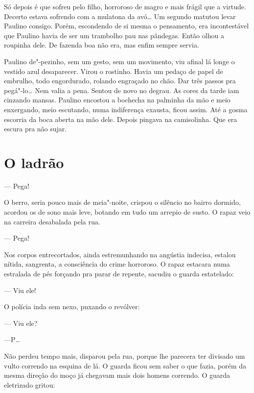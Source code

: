 Só depois é que sofreu pelo filho, horroroso de magro e mais frágil que
a virtude. Decerto estava sofrendo com a mulatona da avó\ldots{} Um segundo
matutou levar Paulino consigo. Porém, escondendo de si mesma o
pensamento, era incontestável que Paulino havia de ser um trambolho pau
nas pândegas. Então olhou a roupinha dele. De fazenda boa não era, mas
enfim sempre servia. 


Paulino de"-pezinho, sem um gesto, sem um movimento, viu afinal lá longe
o vestido azul desaparecer. Virou o rostinho. Havia um pedaço de papel
de embrulho, todo engordurado, rolando engraçado no chão. Dar três
passos pra pegá"-lo\ldots{} Nem valia a pena. Sentou de novo no degrau. As
cores da tarde iam cinzando mansas. Paulino encostou a bochecha na
palminha da mão e meio enxergando, meio escutando, numa indiferença
exausta, ficou assim. Até a gosma escorria da boca aberta na mão dele.
Depois pingava na camisolinha. Que era escura pra não sujar.

\chapter{O ladrão}

--- Pega!

O berro, seria pouco mais de meia"-noite, crispou o silêncio no bairro
dormido, acordou os de sono mais leve, botando em tudo um arrepio de
susto. O rapaz veio na carreira desabalada pela rua.

--- Pega!

Nos corpos entrecortados, ainda estremunhando na angústia indecisa,
estalou nítida, sangrenta, a consciência do crime horroroso. O rapaz
estacara numa estralada de pés forçando pra parar de repente, sacudiu o
guarda estatelado:

--- Viu ele!

O polícia inda sem nexo, puxando o revólver:

--- Viu ele?

---P\ldots{}

Não perdeu tempo mais, disparou pela rua, porque lhe parecera ter
divisado um vulto correndo na esquina de lá. O guarda ficou sem saber o
que fazia, porém da mesma direção do moço já chegavam mais dois homens
correndo. O guarda eletrizado gritou:


